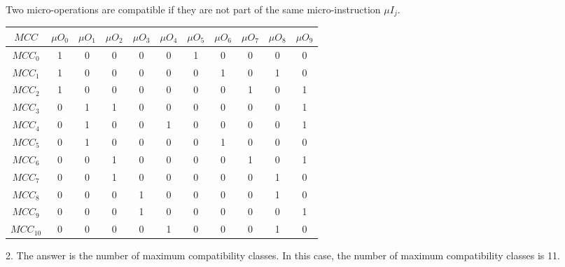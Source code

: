 Two micro-operations are compatible if they are not part of the same micro-instruction $\mu I_{j}$.
\begin{table}[H]
    \centering
    \begin{tabular}{|c|c|c|c|c|c|c|c|c|c|c|}
        \hline
        $MCC$ & $\mu O_{0}$ & $\mu O_{1}$ & $\mu O_{2}$ & $\mu O_{3}$ & $\mu O_{4}$ & $\mu O_{5}$ & $\mu O_{6}$ & $\mu O_{7}$ & $\mu O_{8}$ & $\mu O_{9}$ \\ \hline
        $MCC_{0}$ & 1 & 0 & 0 & 0 & 0 & 1 & 0 & 0 & 0 & 0 \\ \hline
        $MCC_{1}$ & 1 & 0 & 0 & 0 & 0 & 0 & 1 & 0 & 1 & 0 \\ \hline
        $MCC_{2}$ & 1 & 0 & 0 & 0 & 0 & 0 & 0 & 1 & 0 & 1 \\ \hline
        $MCC_{3}$ & 0 & 1 & 1 & 0 & 0 & 0 & 0 & 0 & 0 & 1 \\ \hline
        $MCC_{4}$ & 0 & 1 & 0 & 0 & 1 & 0 & 0 & 0 & 0 & 1 \\ \hline
        $MCC_{5}$ & 0 & 1 & 0 & 0 & 0 & 0 & 1 & 0 & 0 & 0 \\ \hline
        $MCC_{6}$ & 0 & 0 & 1 & 0 & 0 & 0 & 0 & 1 & 0 & 1 \\ \hline
        $MCC_{7}$ & 0 & 0 & 1 & 0 & 0 & 0 & 0 & 0 & 1 & 0 \\ \hline
        $MCC_{8}$ & 0 & 0 & 0 & 1 & 0 & 0 & 0 & 0 & 1 & 0 \\ \hline
        $MCC_{9}$ & 0 & 0 & 0 & 1 & 0 & 0 & 0 & 0 & 0 & 1 \\ \hline
        $MCC_{10}$ & 0 & 0 & 0 & 0 & 1 & 0 & 0 & 0 & 1 & 0 \\ \hline
    \end{tabular}
\end{table}

2. The answer is the number of maximum compatibility classes. In this case, the number of maximum compatibility classes is 11.